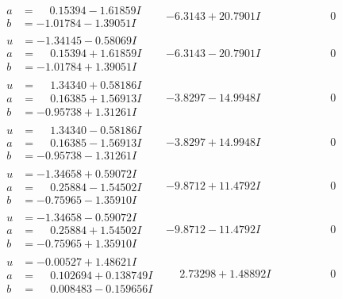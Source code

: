 \documentclass[1p]{elsarticle_modified}
\theoremstyle{definition}
\begin{document}
$$\begin{array}{c|c|c}
\begin{aligned}
a &= \phantom{-}0.15394 - 1.61859 I \\
b &= -1.01784 - 1.39051 I\end{aligned}
 & -6.3143 + 20.7901 I & \phantom{-0.000000 } 0 \\ \hline\begin{aligned}
u &= -1.34145 - 0.58069 I \\
a &= \phantom{-}0.15394 + 1.61859 I \\
b &= -1.01784 + 1.39051 I\end{aligned}
 & -6.3143 - 20.7901 I & \phantom{-0.000000 } 0 \\ \hline\begin{aligned}
u &= \phantom{-}1.34340 + 0.58186 I \\
a &= \phantom{-}0.16385 + 1.56913 I \\
b &= -0.95738 + 1.31261 I\end{aligned}
 & -3.8297 - 14.9948 I & \phantom{-0.000000 } 0 \\ \hline\begin{aligned}
u &= \phantom{-}1.34340 - 0.58186 I \\
a &= \phantom{-}0.16385 - 1.56913 I \\
b &= -0.95738 - 1.31261 I\end{aligned}
 & -3.8297 + 14.9948 I & \phantom{-0.000000 } 0 \\ \hline\begin{aligned}
u &= -1.34658 + 0.59072 I \\
a &= \phantom{-}0.25884 - 1.54502 I \\
b &= -0.75965 - 1.35910 I\end{aligned}
 & -9.8712 + 11.4792 I & \phantom{-0.000000 } 0 \\ \hline\begin{aligned}
u &= -1.34658 - 0.59072 I \\
a &= \phantom{-}0.25884 + 1.54502 I \\
b &= -0.75965 + 1.35910 I\end{aligned}
 & -9.8712 - 11.4792 I & \phantom{-0.000000 } 0 \\ \hline\begin{aligned}
u &= -0.00527 + 1.48621 I \\
a &= \phantom{-}0.102694 + 0.138749 I \\
b &= \phantom{-}0.008483 - 0.159656 I\end{aligned}
 & \phantom{-}2.73298 + 1.48892 I & \phantom{-0.000000 } 0 \\ \hline\begin{aligned}

\end{aligned}
\end{array}$$
\end{document}
